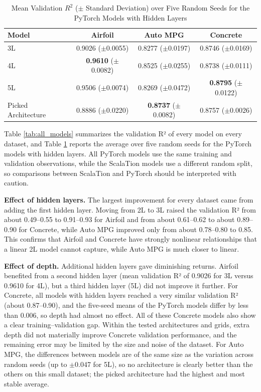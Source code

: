 \documentclass{article}
\begin{document}
\begin{table}[H]
    \centering
    \caption{Mean Validation $R^2$ ($\pm$ Standard Deviation) over Five Random Seeds for the PyTorch Models with Hidden Layers}
    \label{tab:all_models_seeds}
    \begin{tabular}{lccc}
        \hline
        \textbf{Model} & \textbf{Airfoil} & \textbf{Auto MPG} & \textbf{Concrete} \\
        \hline
        3L                  & 0.9026 ($\pm$0.0055) & 0.8277 ($\pm$0.0197) & 0.8746 ($\pm$0.0169) \\
        4L                  & \textbf{0.9610} ($\pm$0.0082) & 0.8525 ($\pm$0.0255) & 0.8738 ($\pm$0.0111) \\
        5L                  & 0.9506 ($\pm$0.0074) & 0.8269 ($\pm$0.0472) & \textbf{0.8795} ($\pm$0.0122) \\
        Picked Architecture & 0.8886 ($\pm$0.0220) & \textbf{0.8737} ($\pm$0.0082) & 0.8757 ($\pm$0.0026) \\
        \hline
    \end{tabular}
\end{table}

Table \ref{tab:all_models} summarizes the validation R² of every model on every dataset, and Table \ref{tab:all_models_seeds} reports the average over five random seeds for the PyTorch models with hidden layers. All PyTorch models use the same training and validation observations, while the ScalaTion models use a different random split, so comparisons between ScalaTion and PyTorch should be interpreted with caution.
\medskip

\textbf{Effect of hidden layers.} The largest improvement for every dataset came from adding the first hidden layer. Moving from 2L to 3L raised the validation R² from about 0.49--0.55 to 0.91--0.93 for Airfoil and from about 0.61--0.62 to about 0.89--0.90 for Concrete, while Auto MPG improved only from about 0.78--0.80 to 0.85. This confirms that Airfoil and Concrete have strongly nonlinear relationships that a linear 2L model cannot capture, while Auto MPG is much closer to linear.
\medskip

\textbf{Effect of depth.} Additional hidden layers gave diminishing returns. Airfoil benefited from a second hidden layer (mean validation R² of 0.9026 for 3L versus 0.9610 for 4L), but a third hidden layer (5L) did not improve it further. For Concrete, all models with hidden layers reached a very similar validation R² (about 0.87--0.90), and the five-seed means of the PyTorch models differ by less than 0.006, so depth had almost no effect. All of these Concrete models also show a clear training--validation gap. Within the tested architectures and grids, extra depth did not materially improve Concrete validation performance, and the remaining error may be limited by the size and noise of the dataset. For Auto MPG, the differences between models are of the same size as the variation across random seeds (up to $\pm$0.047 for 5L), so no architecture is clearly better than the others on this small dataset; the picked architecture had the highest and most stable average.
\medskip
\end{document}
